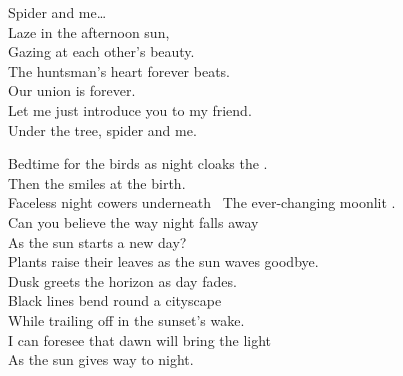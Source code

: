 Spider and me… \\

Laze in the afternoon sun, \\
Gazing at each other's beauty. \\
The huntsman's heart forever beats. \\
Our union is forever. \\

Let me just introduce you to my friend. \\
Under the tree, spider and me. \\









Bedtime for the birds as night cloaks the . \\
Then the  smiles at the  birth. \\
Faceless night cowers underneath \
The ever-changing moonlit . \\
Can you believe the way night falls away \\
As the sun starts a new day? \\

Plants raise their leaves as the sun waves goodbye. \\
Dusk greets the horizon as day fades. \\
Black lines bend round a cityscape \\
While trailing off in the sunset's wake. \\
I can foresee that dawn will bring the light \\
As the sun gives way to night. \\






